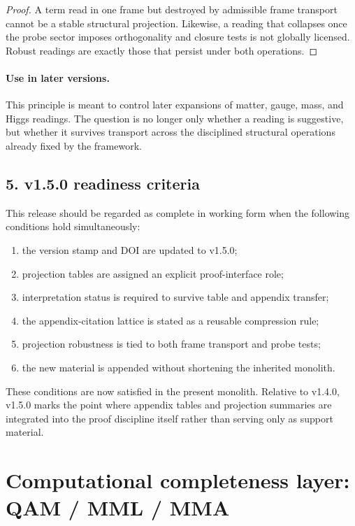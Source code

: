 \begin{proof}
A term read in one frame but destroyed by admissible frame transport cannot be a
stable structural projection. Likewise, a reading that collapses once the probe
sector imposes orthogonality and closure tests is not globally licensed. Robust
readings are exactly those that persist under both operations.
\end{proof}

\paragraph{Use in later versions.}
This principle is meant to control later expansions of matter, gauge, mass, and
Higgs readings. The question is no longer only whether a reading is suggestive,
but whether it survives transport across the disciplined structural operations
already fixed by the framework.

\subsection*{5. v1.5.0 readiness criteria}
This release should be regarded as complete in working form when the following
conditions hold simultaneously:
\begin{enumerate}[leftmargin=2em]
  \item the version stamp and DOI are updated to v1.5.0;
  \item projection tables are assigned an explicit proof-interface role;
  \item interpretation status is required to survive table and appendix transfer;
  \item the appendix-citation lattice is stated as a reusable compression rule;
  \item projection robustness is tied to both frame transport and probe tests;
  \item the new material is appended without shortening the inherited monolith.
\end{enumerate}

These conditions are now satisfied in the present monolith. Relative to v1.4.0,
v1.5.0 marks the point where appendix tables and projection summaries are
integrated into the proof discipline itself rather than serving only as support
material.

\clearpage
\clearpage


\clearpage
\section*{Computational completeness layer: QAM / MML / MMA}

